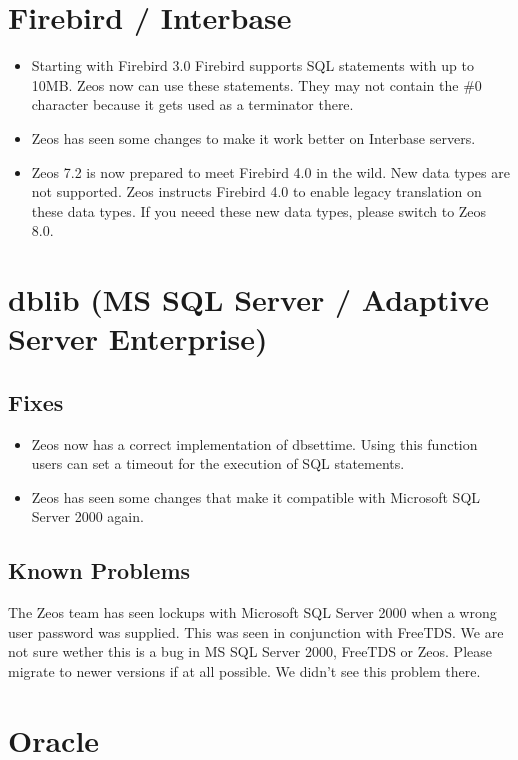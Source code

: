 \documentclass[a4paper,12pt,oneside]{book}
\begin{document}
\section{Firebird / Interbase}
\begin{itemize}
\item Starting with Firebird 3.0 Firebird supports SQL statements with up to 10MB. Zeos now can use these statements. They may not contain the \#0 character because it gets used as a terminator there.
\item Zeos has seen some changes to make it work better on Interbase servers.
\item Zeos 7.2 is now prepared to meet Firebird 4.0 in the wild. New data types are not supported. Zeos instructs Firebird 4.0 to enable legacy translation on these data types. If you neeed these new data types, please switch to Zeos 8.0.
\end{itemize}

\section{dblib (MS SQL Server / Adaptive Server Enterprise)}

\subsection{Fixes}

\begin{itemize}
\item Zeos now has a correct implementation of dbsettime. Using this function users can set a timeout for the execution of SQL statements.
\item Zeos has seen some changes that make it compatible with Microsoft SQL Server 2000 again.
\end{itemize}

\subsection{Known Problems}

The Zeos team has seen lockups with Microsoft SQL Server 2000 when a wrong user password was supplied.
This was seen in conjunction with FreeTDS.
We are not sure wether this is a bug in MS SQL Server 2000, FreeTDS or Zeos.
Please migrate to newer versions if at all possible.
We didn't see this problem there.

\section{Oracle}
\end{document}
